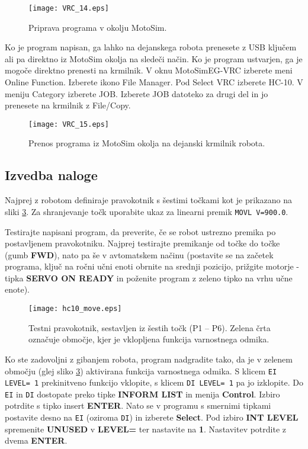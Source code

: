 \begin{figure}[hbt]
	\centering
	\texttt{[image: VRC\_14.eps]}
	\caption{Priprava programa v okolju MotoSim.}
	\label{fig:VRC_14}
\end{figure}

Ko je program napisan, ga lahko na dejanskega robota prenesete z USB ključem ali pa direktno iz MotoSim okolja na sledeči način. Ko je program ustvarjen, ga je mogoče direktno prenesti na krmilnik. V oknu MotoSimEG-VRC izberete meni Online Function. Izberete ikono File Manager. Pod Select VRC izberete HC-10. V meniju Category izberete JOB. Izberete JOB datoteko za drugi del in jo prenesete na krmilnik z File/Copy.

\begin{figure}[hbt]
	\centering
	\texttt{[image: VRC\_15.eps]}
	\caption{Prenos programa iz MotoSim okolja na dejanski krmilnik robota.}
	\label{fig:VRC_15}
\end{figure}

\subsection*{Izvedba naloge}


Najprej z robotom definiraje pravokotnik s šestimi točkami kot je prikazano na sliki \ref{fig:hc10_move}. Za shranjevanje točk uporabite ukaz za linearni premik \verb"MOVL V=900.0".

Testirajte napisani program, da preverite, če se robot ustrezno premika po postavljenem pravokotniku. Najprej testirajte premikanje od točke do točke (gumb \textbf{FWD}), nato pa še v avtomatskem načinu (postavite se na začetek programa, ključ na ročni učni enoti obrnite na srednji pozicijo, prižgite motorje - tipka \textbf{SERVO ON READY} in poženite program z zeleno tipko na vrhu učne enote).

\begin{figure}[!hbt]
	\centering
	\texttt{[image: hc10\_move.eps]}
	\caption{Testni pravokotnik, sestavljen iz šestih točk (P1 -- P6). Zelena črta označuje območje, kjer je vklopljena funkcija varnostnega odmika. }
	\label{fig:hc10_move}
\end{figure}

Ko ste zadovoljni z gibanjem robota, program nadgradite tako, da je v zelenem območju (glej sliko \ref{fig:hc10_move}) aktivirana funkcija varnostnega odmika. S klicem \verb"EI LEVEL= 1" prekinitveno funkcijo vklopite, s klicem \verb"DI LEVEL= 1" pa jo izklopite. Do \verb"EI" in \verb"DI" dostopate preko tipke \textbf{INFORM LIST} in menija \textbf{Control}. Izbiro potrdite s tipko insert \textbf{ENTER}. Nato se v programu s smernimi tipkami postavite desno na \verb"EI" (oziroma \verb"DI") in izberete \textbf{Select}. Pod izbiro \textbf{INT LEVEL} spremenite \textbf{UNUSED} v \textbf{LEVEL=} ter nastavite na \textbf{1}. Nastavitev potrdite z dvema \textbf{ENTER}.

